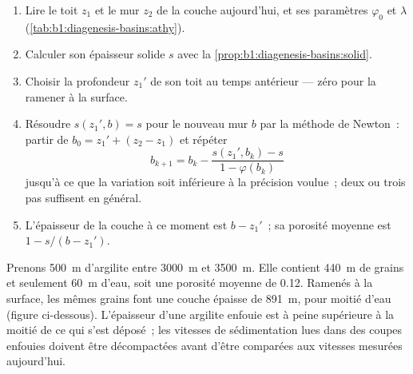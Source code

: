 \begin{method}\label{met:b1:diagenesis-basins:decompaction}
\begin{enumerate}
  \item Lire le toit $z_1$ et le mur $z_2$ de la couche aujourd'hui, et ses
        paramètres $\varphi_0$ et $\lambda$
        (\cref{tab:b1:diagenesis-basins:athy}).
  \item Calculer son épaisseur solide $s$ avec
        la \cref{prop:b1:diagenesis-basins:solid}.
  \item Choisir la profondeur $z_1'$ de son toit au temps antérieur --- zéro pour
        la ramener à la surface.
  \item Résoudre $s(z_1', b) = s$ pour le nouveau mur $b$ par la méthode de Newton~:
        partir de $b_0 = z_1' + (z_2 - z_1)$ et répéter
        \[
          b_{k+1} = b_k - \frac{s(z_1', b_k) - s}{1 - \varphi(b_k)}
        \]
        jusqu'à ce que la variation soit inférieure à la précision voulue~; deux ou trois pas
        suffisent en général.
  \item L'épaisseur de la couche à ce moment est $b - z_1'$~; sa porosité
        moyenne est $1 - s/(b - z_1')$.
\end{enumerate}
\end{method}

Prenons \qty{500}{m} d'argilite entre \qty{3000}{m} et \qty{3500}{m}. Elle contient
\qty{440}{m} de grains et seulement \qty{60}{m} d'eau, soit une porosité moyenne de
\num{0.12}. Ramenés à la surface, les mêmes grains font une couche épaisse de
\qty{891}{m}, pour moitié d'eau (figure ci-dessous). L'épaisseur d'une
argilite enfouie est à peine supérieure à la moitié de ce qui s'est déposé~; les vitesses de sédimentation
lues dans des coupes enfouies doivent être décompactées avant d'être comparées aux
vitesses mesurées aujourd'hui.

